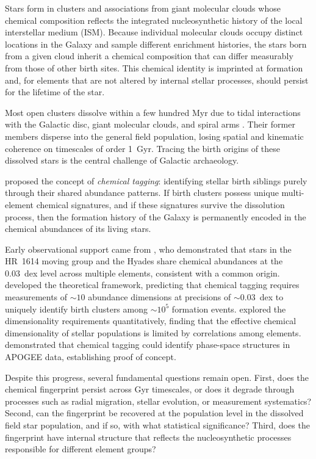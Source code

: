 \documentclass[fleqn,usenatbib]{mnras}
\begin{document}
Stars form in clusters and associations from giant molecular clouds whose chemical composition reflects the integrated nucleosynthetic history of the local interstellar medium (ISM).
Because individual molecular clouds occupy distinct locations in the Galaxy and sample different enrichment histories, the stars born from a given cloud inherit a chemical composition that can differ measurably from those of other birth sites.
This chemical identity is imprinted at formation and, for elements that are not altered by internal stellar processes, should persist for the lifetime of the star.

Most open clusters dissolve within a few hundred Myr due to tidal interactions with the Galactic disc, giant molecular clouds, and spiral arms \citep{BinneyTremaine2008, Meingast2019}.
Their former members disperse into the general field population, losing spatial and kinematic coherence on timescales of order 1~Gyr.
Tracing the birth origins of these dissolved stars is the central challenge of Galactic archaeology.

\citet{Freeman2002} proposed the concept of \emph{chemical tagging}: identifying stellar birth siblings purely through their shared abundance patterns.
If birth clusters possess unique multi-element chemical signatures, and if these signatures survive the dissolution process, then the formation history of the Galaxy is permanently encoded in the chemical abundances of its living stars.

Early observational support came from \citet{DeSilva2006, DeSilva2007}, who demonstrated that stars in the HR~1614 moving group and the Hyades share chemical abundances at the 0.03~dex level across multiple elements, consistent with a common origin.
\citet{BlandHawthorn2010} developed the theoretical framework, predicting that chemical tagging requires measurements of ${\sim}10$ abundance dimensions at precisions of ${\sim}0.03$~dex to uniquely identify birth clusters among ${\sim}10^5$ formation events.
\citet{Ting2015} explored the dimensionality requirements quantitatively, finding that the effective chemical dimensionality of stellar populations is limited by correlations among elements.
\citet{Hogg2016} demonstrated that chemical tagging could identify phase-space structures in APOGEE data, establishing proof of concept.

Despite this progress, several fundamental questions remain open.
First, does the chemical fingerprint persist across Gyr timescales, or does it degrade through processes such as radial migration, stellar evolution, or measurement systematics?
Second, can the fingerprint be recovered at the population level in the dissolved field star population, and if so, with what statistical significance?
Third, does the fingerprint have internal structure that reflects the nucleosynthetic processes responsible for different element groups?
\end{document}
